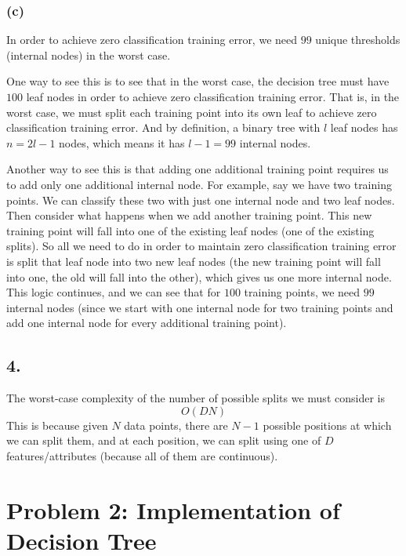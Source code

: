 \documentclass{article}
\begin{document}
\vspace{5mm}

\subsubsection*{(c)}
In order to achieve zero classification training error, we need $99$ unique
thresholds (internal nodes) in the worst case.

One way to see this is to
see that in the worst case, the decision tree must have $100$ leaf nodes in order
to achieve zero classification training error. That is, in the worst case, we must split
each training point into its own leaf to achieve zero classification training error.
And by definition, a binary tree with $l$ leaf nodes has $n = 2l - 1$ nodes,
which means it has $l - 1 = 99$ internal nodes.

Another way to see this is that
adding one additional training point requires us to add only one additional
internal node. For example, say we have two training points. We can classify
these two with just one internal node and two leaf nodes. Then consider what happens
when we add another training point. This new training point will fall into
one of the existing leaf nodes (one of the existing splits). So all we need to do
in order to maintain zero classification training error is split that leaf node
into two new leaf nodes (the new training point will fall into one, the old will
fall into the other), which gives us one more internal node. This logic continues,
and we can see that for $100$ training points, we need $99$ internal nodes (since
we start with one internal node for two training points and add one internal node
for every additional training point).

\subsection*{4.}
The worst-case complexity of the number of possible splits we must consider is
\[ O(DN) \]
This is because given $N$ data points, there are $N-1$ possible positions at which
we can split them, and at each position, we can split using one of $D$ features/attributes (because
all of them are continuous).

\newpage
\section*{Problem 2: Implementation of Decision Tree}
\end{document}
